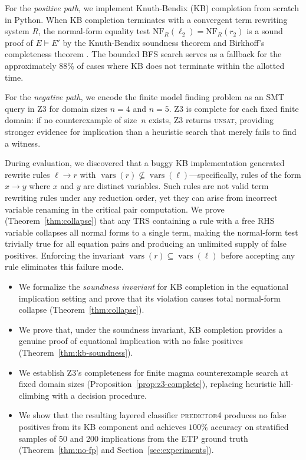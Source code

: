 For the \emph{positive path}, we implement Knuth-Bendix (KB) completion
\cite{knuth1970simple} from scratch in Python.  When KB completion terminates
with a convergent term rewriting system $R$, the normal-form equality test
$\mathrm{NF}_R(\ell_2) = \mathrm{NF}_R(r_2)$ is a sound proof of $E \models E'$
by the Knuth-Bendix soundness theorem and Birkhoff's completeness theorem
\cite{birkhoff1935structure}.  The bounded BFS search serves as a fallback for
the approximately 88\% of cases where KB does not terminate within the allotted time.

For the \emph{negative path}, we encode the finite model finding problem as an
SMT query in Z3 \cite{demoura2008z3} for domain sizes $n = 4$ and $n = 5$.
Z3 is complete for each fixed finite domain: if no counterexample of size~$n$
exists, Z3 returns \textsc{unsat}, providing stronger evidence for implication
than a heuristic search that merely fails to find a witness.

During evaluation, we discovered that a buggy KB implementation generated rewrite
rules $\ell \to r$ with $\operatorname{vars}(r) \not\subseteq \operatorname{vars}(\ell)$---specifically,
rules of the form $x \to y$ where $x$ and $y$ are distinct variables.  Such rules
are not valid term rewriting rules under any reduction order, yet they can arise
from incorrect variable renaming in the critical pair computation.  We prove
(Theorem~\ref{thm:collapse}) that any TRS containing a rule with a free RHS variable
collapses all normal forms to a single term, making the normal-form test trivially
true for all equation pairs and producing an unlimited supply of false positives.
Enforcing the invariant $\operatorname{vars}(r) \subseteq \operatorname{vars}(\ell)$ before accepting
any rule eliminates this failure mode.

\begin{itemize}[leftmargin=*,itemsep=2pt,topsep=2pt]
  \item We formalize the \emph{soundness invariant} for KB completion in the equational
        implication setting and prove that its violation causes total normal-form collapse
        (Theorem~\ref{thm:collapse}).
  \item We prove that, under the soundness invariant, KB completion provides a genuine
        proof of equational implication with no false positives
        (Theorem~\ref{thm:kb-soundness}).
  \item We establish Z3's completeness for finite magma counterexample search at fixed
        domain sizes (Proposition~\ref{prop:z3-complete}), replacing heuristic hill-climbing
        with a decision procedure.
  \item We show that the resulting layered classifier \textsc{predictor4} produces no false
        positives from its KB component and achieves $100\%$ accuracy on stratified samples
        of 50 and 200 implications from the ETP ground truth
        (Theorem~\ref{thm:no-fp} and Section~\ref{sec:experiments}).
\end{itemize}

